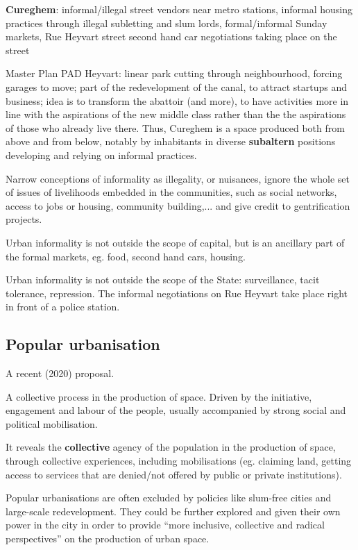 \documentclass{article}
\begin{document}
\textbf{Cureghem}: informal/illegal street vendors near metro stations, informal housing practices through illegal subletting and slum lords, formal/informal Sunday markets, Rue Heyvart street second hand car negotiations taking place on the street

Master Plan PAD Heyvart: linear park cutting through neighbourhood, forcing garages to move; part of the redevelopment of the canal, to attract startups and business; idea is to transform the abattoir (and more), to have activities more in line with the aspirations of the new middle class rather than the the aspirations of those who already live there. Thus, Cureghem is a space produced both from above and from below, notably by inhabitants in diverse \textbf{subaltern} positions developing and relying on informal practices.

Narrow conceptions of informality as illegality, or nuisances, ignore the whole set of issues of livelihoods embedded in the communities, such as social networks, access to jobs or housing, community building,... and give credit to gentrification projects. 

Urban informality is not outside the scope of capital, but is an ancillary part of the formal markets, eg. food, second hand cars, housing.

Urban informality is not outside the scope of the State: surveillance, tacit tolerance, repression. The informal negotiations on Rue Heyvart take place right in front of a police station.

\subsection{Popular urbanisation}

A recent (2020) proposal.

A collective process in the production of space. Driven by the initiative, engagement and labour of the people, usually accompanied by strong social and political mobilisation.

It reveals the \textbf{collective} agency of the population in the production of space, through collective experiences, including mobilisations (eg. claiming land, getting access to services that are denied/not offered by public or private institutions).

Popular urbanisations are often excluded by policies like slum-free cities and large-scale redevelopment. They could be further explored and given their own power in the city in order to provide ``more inclusive, collective and radical perspectives'' on the production of urban space.
\end{document}

